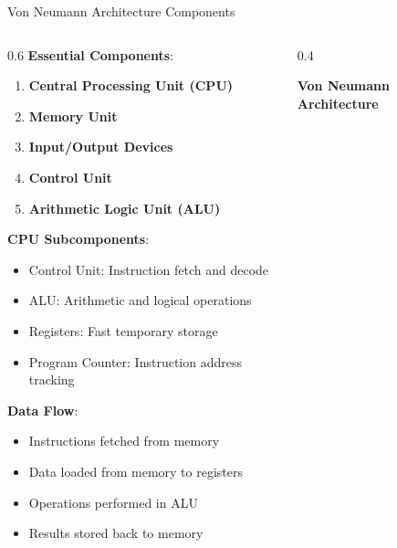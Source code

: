 \documentclass[aspectratio=169]{beamer}
\newcommand{\concept}[1]{\textbf{\color{darkblue}#1}}
\begin{document}
\begin{frame}{Von Neumann Architecture Components}
\begin{columns}
\begin{column}{0.6\textwidth}
\concept{Essential Components}:
\begin{enumerate}
\item \textbf{Central Processing Unit (CPU)}
\item \textbf{Memory Unit}
\item \textbf{Input/Output Devices}
\item \textbf{Control Unit}
\item \textbf{Arithmetic Logic Unit (ALU)}
\end{enumerate}

\vspace{0.3cm}
\concept{CPU Subcomponents}:
\begin{itemize}
\item Control Unit: Instruction fetch and decode
\item ALU: Arithmetic and logical operations
\item Registers: Fast temporary storage
\item Program Counter: Instruction address tracking
\end{itemize}

\vspace{0.3cm}
\concept{Data Flow}:
\begin{itemize}
\item Instructions fetched from memory
\item Data loaded from memory to registers
\item Operations performed in ALU
\item Results stored back to memory
\end{itemize}
\end{column}
\begin{column}{0.4\textwidth}
\begin{center}
\textbf{Von Neumann Architecture}
\vspace{0.3cm}

\end{center}
\end{column}
\end{columns}
\end{frame}
\end{document}
